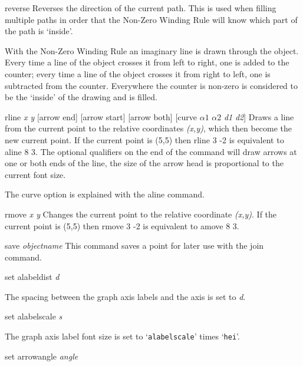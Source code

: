 \begin{commanddescription}
\item[{\sf reverse }]
Reverses the direction of the current path.  This is used when filling
multiple paths in order that the Non-Zero Winding Rule will know which
part of the path is `inside'.

With the Non-Zero Winding Rule an imaginary line is drawn through the
object. Every time a line of the object crosses it from left to
right, one is added to the counter; every time a line of the object
crosses it from right to left, one is subtracted from the counter. Everywhere
the counter is non-zero is considered to be the `inside' of the drawing and
is filled.


\item[{\sf rline {\it x y} [arrow end] [arrow start] [arrow both] [curve {\it $\alpha1$} {\it $\alpha2$} {\it d1} {\it d2}]}]
Draws a line from the current point to the relative coordinates {\it (x,y)},
which then become the new current point.  If the current point is (5,5) then
{\sf rline 3 -2} is equivalent to {\sf aline 8 3}.  The optional
qualifiers on the end of the command will draw arrows at one or both
ends of the line,  the size of the arrow head is proportional to the current
font size.

The {\sf curve} option is explained with the {\sf aline} command.

\item[{\sf rmove {\it x y}}]
 Changes the current point to the relative coordinate
{\it (x,y)}.  If the
current point is (5,5) then {\sf rmove 3 -2} is equivalent to {\sf amove 8 3}.

\item[{\sf save {\it objectname}} ]
This command saves a point for later use with the join command.

\item[{\sf set alabeldist {\it d}}]

The spacing between the graph axis labels and the axis is set to {\it d}.

\item[{\sf set alabelscale {\it s}}]

The graph axis label font size is set to `\texttt{alabelscale}' times `\texttt{hei}'.

\item[{\sf set arrowangle {\it angle}}]


\end{commanddescription}

